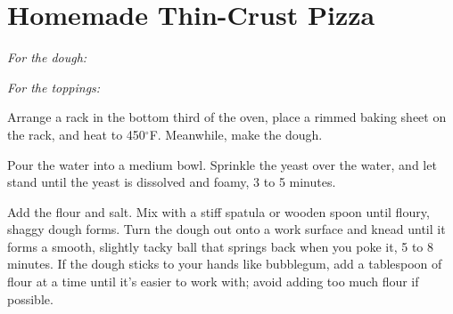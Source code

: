 \section{Homemade Thin-Crust Pizza}
\begin{recipe}
	
	
	\textit{For the dough:}	
	

	\textit{For the toppings:}	
	
	
	Arrange a rack in the bottom third of the oven, place a rimmed baking sheet on the rack, and heat to 450$^{\circ}$F. Meanwhile, make the dough.
	
	Pour the water into a medium bowl. Sprinkle the yeast over the water, and let stand until the yeast is dissolved and foamy, 3 to 5 minutes.
	
	Add the flour and salt. Mix with a stiff spatula or wooden spoon until floury, shaggy dough forms. Turn the dough out onto a work surface and knead until it forms a smooth, slightly tacky ball that springs back when you poke it, 5 to 8 minutes. If the dough sticks to your hands like bubblegum, add a tablespoon of flour at a time until it’s easier to work with; avoid adding too much flour if possible.
	

\end{recipe}
